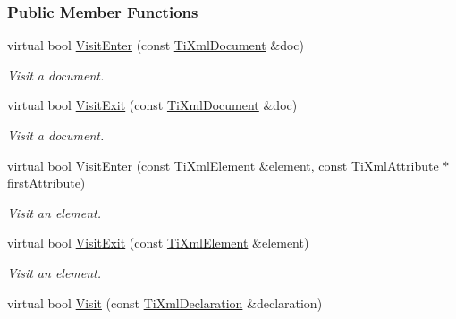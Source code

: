 \subsubsection*{Public Member Functions}
\begin{DoxyCompactItemize}
\item 
\hypertarget{class_ti_xml_printer_a2ec73087db26ff4d2c4316c56f861db7}{
virtual bool \hyperlink{class_ti_xml_printer_a2ec73087db26ff4d2c4316c56f861db7}{VisitEnter} (const \hyperlink{class_ti_xml_document}{TiXmlDocument} \&doc)}
\label{class_ti_xml_printer_a2ec73087db26ff4d2c4316c56f861db7}

\begin{DoxyCompactList}\small\item\em Visit a document. \item\end{DoxyCompactList}\item 
\hypertarget{class_ti_xml_printer_a0a636046fa589b6d7f3e5bd025b3f33e}{
virtual bool \hyperlink{class_ti_xml_printer_a0a636046fa589b6d7f3e5bd025b3f33e}{VisitExit} (const \hyperlink{class_ti_xml_document}{TiXmlDocument} \&doc)}
\label{class_ti_xml_printer_a0a636046fa589b6d7f3e5bd025b3f33e}

\begin{DoxyCompactList}\small\item\em Visit a document. \item\end{DoxyCompactList}\item 
\hypertarget{class_ti_xml_printer_a6dccaf5ee4979f13877690afe28721e8}{
virtual bool \hyperlink{class_ti_xml_printer_a6dccaf5ee4979f13877690afe28721e8}{VisitEnter} (const \hyperlink{class_ti_xml_element}{TiXmlElement} \&element, const \hyperlink{class_ti_xml_attribute}{TiXmlAttribute} $\ast$firstAttribute)}
\label{class_ti_xml_printer_a6dccaf5ee4979f13877690afe28721e8}

\begin{DoxyCompactList}\small\item\em Visit an element. \item\end{DoxyCompactList}\item 
\hypertarget{class_ti_xml_printer_ae6a1df8271df4bf62d7873c38e34aa69}{
virtual bool \hyperlink{class_ti_xml_printer_ae6a1df8271df4bf62d7873c38e34aa69}{VisitExit} (const \hyperlink{class_ti_xml_element}{TiXmlElement} \&element)}
\label{class_ti_xml_printer_ae6a1df8271df4bf62d7873c38e34aa69}

\begin{DoxyCompactList}\small\item\em Visit an element. \item\end{DoxyCompactList}\item 
\hypertarget{class_ti_xml_printer_adaf7eec4dc43ad071ff52b60361574f5}{
virtual bool \hyperlink{class_ti_xml_printer_adaf7eec4dc43ad071ff52b60361574f5}{Visit} (const \hyperlink{class_ti_xml_declaration}{TiXmlDeclaration} \&declaration)}
\label{class_ti_xml_printer_adaf7eec4dc43ad071ff52b60361574f5}


\end{DoxyCompactItemize}
